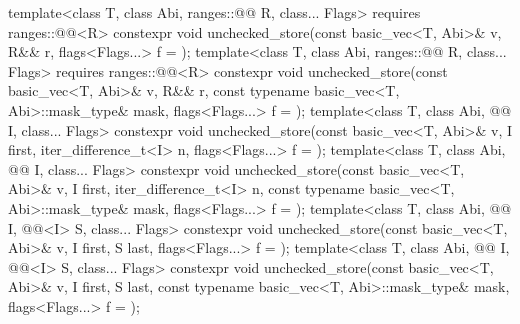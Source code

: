 \begin{itemdecl}
template<class T, class Abi, ranges::@@ R, class... Flags>
  requires ranges::@@<R>
  constexpr void unchecked_store(const basic_vec<T, Abi>& v, R&& r, flags<Flags...> f = {});
template<class T, class Abi, ranges::@@ R, class... Flags>
  requires ranges::@@<R>
  constexpr void unchecked_store(const basic_vec<T, Abi>& v, R&& r,
                                 const typename basic_vec<T, Abi>::mask_type& mask,
                                 flags<Flags...> f = {});
template<class T, class Abi, @@ I, class... Flags>
  constexpr void unchecked_store(const basic_vec<T, Abi>& v, I first, iter_difference_t<I> n,
                                 flags<Flags...> f = {});
template<class T, class Abi, @@ I, class... Flags>
  constexpr void unchecked_store(const basic_vec<T, Abi>& v, I first, iter_difference_t<I> n,
                                 const typename basic_vec<T, Abi>::mask_type& mask,
                                 flags<Flags...> f = {});
template<class T, class Abi, @@ I, @@<I> S, class... Flags>
  constexpr void unchecked_store(const basic_vec<T, Abi>& v, I first, S last,
                                 flags<Flags...> f = {});
template<class T, class Abi, @@ I, @@<I> S, class... Flags>
  constexpr void unchecked_store(const basic_vec<T, Abi>& v, I first, S last,
                                 const typename basic_vec<T, Abi>::mask_type& mask,
                                 flags<Flags...> f = {});
\end{itemdecl}

